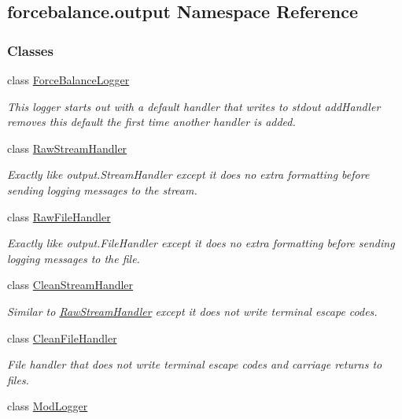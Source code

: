 \hypertarget{namespaceforcebalance_1_1output}{\subsection{forcebalance.\-output Namespace Reference}
\label{namespaceforcebalance_1_1output}
}
\subsubsection*{Classes}
\begin{DoxyCompactItemize}
\item 
class \hyperlink{classforcebalance_1_1output_1_1ForceBalanceLogger}{Force\-Balance\-Logger}
\begin{DoxyCompactList}\small\item\em This logger starts out with a default handler that writes to stdout add\-Handler removes this default the first time another handler is added. \end{DoxyCompactList}\item 
class \hyperlink{classforcebalance_1_1output_1_1RawStreamHandler}{Raw\-Stream\-Handler}
\begin{DoxyCompactList}\small\item\em Exactly like output.\-Stream\-Handler except it does no extra formatting before sending logging messages to the stream. \end{DoxyCompactList}\item 
class \hyperlink{classforcebalance_1_1output_1_1RawFileHandler}{Raw\-File\-Handler}
\begin{DoxyCompactList}\small\item\em Exactly like output.\-File\-Handler except it does no extra formatting before sending logging messages to the file. \end{DoxyCompactList}\item 
class \hyperlink{classforcebalance_1_1output_1_1CleanStreamHandler}{Clean\-Stream\-Handler}
\begin{DoxyCompactList}\small\item\em Similar to \hyperlink{classforcebalance_1_1output_1_1RawStreamHandler}{Raw\-Stream\-Handler} except it does not write terminal escape codes. \end{DoxyCompactList}\item 
class \hyperlink{classforcebalance_1_1output_1_1CleanFileHandler}{Clean\-File\-Handler}
\begin{DoxyCompactList}\small\item\em File handler that does not write terminal escape codes and carriage returns to files. \end{DoxyCompactList}\item 
class \hyperlink{classforcebalance_1_1output_1_1ModLogger}{Mod\-Logger}
\end{DoxyCompactItemize}
